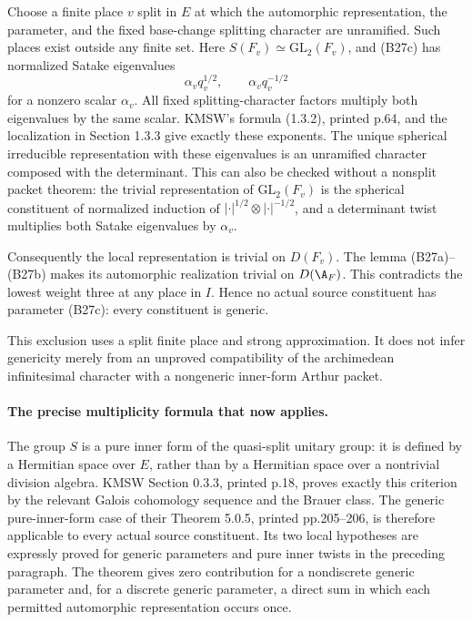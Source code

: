 Choose a finite place $v$ split in $E$ at which the automorphic
representation, the parameter, and the fixed base-change splitting
character are unramified.  Such places exist outside any finite
set.  Here $S(F_v)\simeq\mathrm{GL}_2(F_v)$, and (B27c)
has normalized Satake eigenvalues
\[
              \alpha_v q_v^{1/2},\qquad
              \alpha_v q_v^{-1/2}
 \tag{B27d}
\]
for a nonzero scalar $\alpha_v$.  All fixed splitting-character
factors multiply both eigenvalues by the same scalar.  KMSW's
formula (1.3.2), printed p.64, and the localization in
Section 1.3.3 give exactly these exponents.  The unique spherical
irreducible representation with these eigenvalues is an
unramified character composed with the determinant.  This can
also be checked without a nonsplit packet theorem: the trivial
representation of $\mathrm{GL}_2(F_v)$ is the spherical
constituent of normalized induction of
$|\cdot|^{1/2}\otimes|\cdot|^{-1/2}$, and a determinant twist
multiplies both Satake eigenvalues by $\alpha_v$.

Consequently the local representation is trivial on $D(F_v)$.
The lemma (B27a)--(B27b) makes its automorphic realization
trivial on $D(\A_F)$.  This contradicts the lowest weight three
at any place in $I$.  Hence no actual source constituent has
parameter (B27c): every constituent is generic.

This exclusion uses a split finite place and strong approximation.
It does not infer genericity merely from an unproved compatibility
of the archimedean infinitesimal character with a nongeneric
inner-form Arthur packet.

\paragraph{The precise multiplicity formula that now applies.}
The group $S$ is a pure inner form of the quasi-split unitary
group: it is defined by a Hermitian space over $E$, rather than
by a Hermitian space over a nontrivial division algebra.
KMSW Section 0.3.3, printed p.18, proves exactly this criterion
by the relevant Galois cohomology sequence and the Brauer class.
The generic pure-inner-form case of their Theorem 5.0.5,
printed pp.205--206, is therefore applicable to every actual
source constituent.  Its two local hypotheses are expressly
proved for generic parameters and pure inner twists in the
preceding paragraph.  The theorem gives zero contribution for
a nondiscrete generic parameter and, for a discrete generic
parameter, a direct sum in which each permitted automorphic
representation occurs once.

